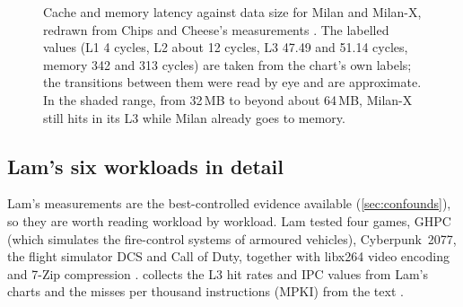 \begin{figure}[htbp]
\centering
{}
\caption[Cache and memory latency of Milan and Milan-X against data size]{Cache and memory latency against data size for Milan and Milan-X, redrawn from Chips and Cheese's measurements \cite{cozmaAMDsVCacheTested2022}. The labelled values (L1 4 cycles, L2 about 12 cycles, L3 47.49 and 51.14 cycles, memory 342 and 313 cycles) are taken from the chart's own labels; the transitions between them were read by eye and are approximate. In the shaded range, from 32\,MB to beyond about 64\,MB, Milan-X still hits in its L3 while Milan already goes to memory.}
\label{fig:milanx-latency}
\end{figure}

\subsection{Lam's six workloads in detail}
\label{sec:lam-detail}
Lam's measurements are the best-controlled evidence available (\cref{sec:confounds}), so they are worth reading workload by workload. Lam tested four games, GHPC (which simulates the fire-control systems of armoured vehicles), Cyberpunk~2077, the flight simulator DCS and Call of Duty, together with libx264 video encoding and 7-Zip compression \cite{lamAMDs7950X3DZen2023}.  collects the L3 hit rates and IPC values from Lam's charts and the misses per thousand instructions (MPKI) from the text \cite{lamAMDs7950X3DZen2023}.


